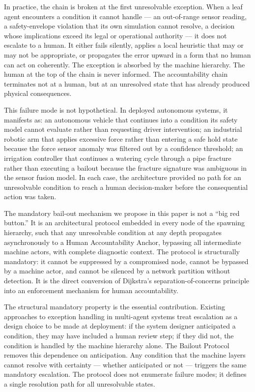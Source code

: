In practice, the chain is broken at the first unresolvable exception. When a leaf agent encounters a condition it cannot handle — an out-of-range sensor reading, a safety-envelope violation that its own simulation cannot resolve, a decision whose implications exceed its legal or operational authority — it does not escalate to a human. It either fails silently, applies a local heuristic that may or may not be appropriate, or propagates the error upward in a form that no human can act on coherently. The exception is absorbed by the machine hierarchy. The human at the top of the chain is never informed. The accountability chain terminates not at a human, but at an unresolved state that has already produced physical consequences.

This failure mode is not hypothetical. In deployed autonomous systems, it manifests as: an autonomous vehicle that continues into a condition its safety model cannot evaluate rather than requesting driver intervention; an industrial robotic arm that applies excessive force rather than entering a safe hold state because the force sensor anomaly was filtered out by a confidence threshold; an irrigation controller that continues a watering cycle through a pipe fracture rather than executing a bailout because the fracture signature was ambiguous in the sensor fusion model. In each case, the architecture provided no path for an unresolvable condition to reach a human decision-maker before the consequential action was taken.

The mandatory bail-out mechanism we propose in this paper is not a ``big red button.'' It is an architectural protocol embedded in every node of the spawning hierarchy, such that any unresolvable condition at any depth propagates asynchronously to a Human Accountability Anchor, bypassing all intermediate machine actors, with complete diagnostic context. The protocol is structurally mandatory: it cannot be suppressed by a compromised node, cannot be bypassed by a machine actor, and cannot be silenced by a network partition without detection. It is the direct conversion of Dijkstra's separation-of-concerns principle into an enforcement mechanism for human accountability.

The structural mandatory property is the essential contribution. Existing approaches to exception handling in multi-agent systems treat escalation as a design choice to be made at deployment: if the system designer anticipated a condition, they may have included a human review step; if they did not, the condition is handled by the machine hierarchy alone. The Bailout Protocol removes this dependence on anticipation. Any condition that the machine layers cannot resolve with certainty — whether anticipated or not — triggers the same mandatory escalation. The protocol does not enumerate failure modes; it defines a single resolution path for all unresolvable states.

